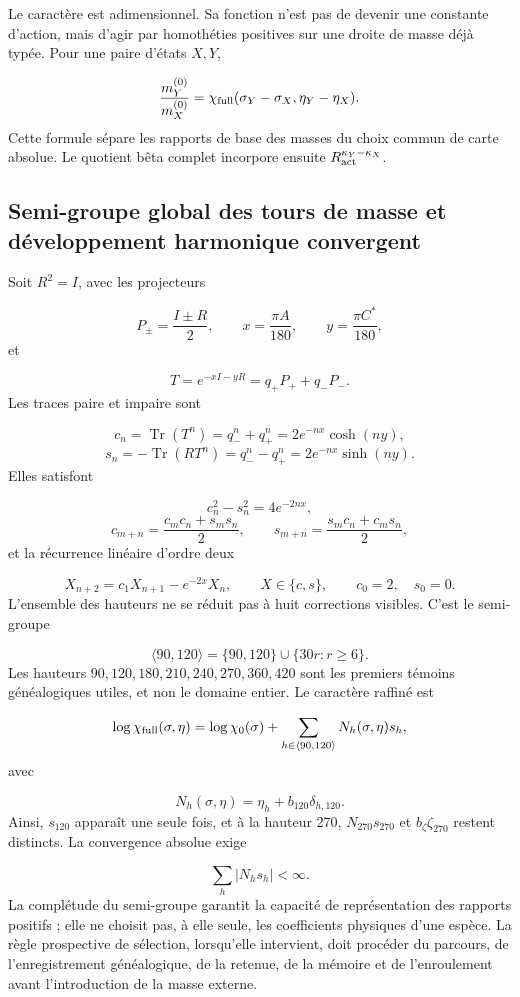 Le caractère est adimensionnel. Sa fonction n'est pas de devenir une constante d'action, mais d'agir par homothéties positives sur une droite de masse déjà typée. Pour une paire d'états \(X,Y\),

\[
\frac{m_Y^{(0)}}{m_X^{(0)}}
=\chi_{\rm full}(\sigma_Y-\sigma_X,\eta_Y-\eta_X).
\]
Cette formule sépare les rapports de base des masses du choix commun de carte absolue. Le quotient bêta complet incorpore ensuite \(R_{\rm act}^{\kappa_Y-\kappa_X}\).

\subsection{Semi-groupe global des tours de masse et développement harmonique convergent}
Soit \(R^2=I\), avec les projecteurs

\[
P_\pm=\frac{I\pm R}{2},
\qquad
x=\frac{\pi A}{180},
\qquad
y=\frac{\pi C^*}{180},
\]
et

\[
T=e^{-xI-yR}=q_+P_++q_-P_-.
\]
Les traces paire et impaire sont

\[
c_n=\operatorname{Tr}(T^n)=q_-^n+q_+^n
=2e^{-nx}\cosh(ny),
\]
\[
s_n=-\operatorname{Tr}(RT^n)=q_-^n-q_+^n
=2e^{-nx}\sinh(ny).
\]
Elles satisfont

\[
c_n^2-s_n^2=4e^{-2nx},
\]
\[
c_{m+n}=\frac{c_mc_n+s_ms_n}{2},
\qquad
s_{m+n}=\frac{s_mc_n+c_ms_n}{2},
\]
et la récurrence linéaire d'ordre deux

\[
X_{n+2}=c_1X_{n+1}-e^{-2x}X_n,
\qquad X\in\{c,s\},
\qquad c_0=2,\quad s_0=0.
\]
L'ensemble des hauteurs ne se réduit pas à huit corrections visibles. C'est le semi-groupe

\[
\langle90,120\rangle
=\{90,120\}\cup\{30r:r\ge6\}.
\]
Les hauteurs \(90,120,180,210,240,270,360,420\) sont les premiers témoins généalogiques utiles, et non le domaine entier. Le caractère raffiné est

\[
\log\chi_{\rm full}(\sigma,\eta)
=\log\chi_0(\sigma)
+\sum_{h\in\langle90,120\rangle}N_h(\sigma,\eta)s_h,
\]
avec

\[
N_h(\sigma,\eta)=\eta_h+b_{120}\delta_{h,120}.
\]
Ainsi, \(s_{120}\) apparaît une seule fois, et à la hauteur 270, \(N_{270}s_{270}\) et \(b_\zeta\zeta_{270}\) restent distincts. La convergence absolue exige

\[
\sum_h |N_hs_h|<\infty.
\]
La complétude du semi-groupe garantit la capacité de représentation des rapports positifs ; elle ne choisit pas, à elle seule, les coefficients physiques d'une espèce. La règle prospective de sélection, lorsqu'elle intervient, doit procéder du parcours, de l'enregistrement généalogique, de la retenue, de la mémoire et de l'enroulement avant l'introduction de la masse externe.

